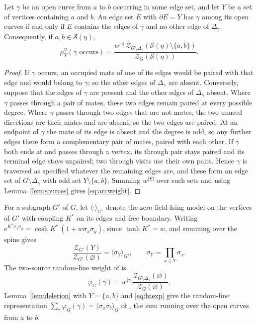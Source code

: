 \begin{lemma}\label{lem:deletion}
Let $\gamma$ be an open curve from $a$ to $b$ occurring in some edge set, and let $Y$ be a set of vertices containing $a$ and $b$. An edge set $E$ with $\partial E=Y$ has $\gamma$ among its open curves if and only if $E$ contains the edges of $\gamma$ and no other edge of $\Delta_\gamma$. Consequently, if $a,b\in\mathcal S(\eta)$,
\begin{equation}\label{eq:arcweight}
 \mu_V^\eta(\gamma\text{ occurs})
 =\frac{w^{|\gamma|}\,\mathcal Z_{G\setminus\Delta_\gamma}(\mathcal S(\eta)\setminus\{a,b\})}{\mathcal Z_G(\mathcal S(\eta))}.
\end{equation}
\end{lemma}
\begin{proof}
If $\gamma$ occurs, an occupied mate of one of its edges would be paired with that edge and would belong to $\gamma$; so the other edges of $\Delta_\gamma$ are absent. Conversely, suppose that the edges of $\gamma$ are present and the other edges of $\Delta_\gamma$ absent. Where $\gamma$ passes through a pair of mates, these two edges remain paired at every possible degree. Where $\gamma$ passes through two edges that are not mates, the two unused directions are their mates and are absent, so the two edges are paired. At an endpoint of $\gamma$ the mate of its edge is absent and the degree is odd, so any further edges there form a complementary pair of mates, paired with each other. If $\gamma$ both ends at and passes through a vertex, its through pair stays paired and its terminal edge stays unpaired; two through visits use their own pairs. Hence $\gamma$ is traversed as specified whatever the remaining edges are, and these form an edge set of $G\setminus\Delta_\gamma$ with odd set $Y\setminus\{a,b\}$. Summing $w^{|E|}$ over such sets and using Lemma~\ref{lem:sources} gives \eqref{eq:arcweight}.
\end{proof}

For a subgraph $G'$ of $G$, let $\langle\cdot\rangle_{G'}$ denote the zero-field Ising model on the vertices of $G'$ with coupling $K^*$ on its edges and free boundary. Writing $e^{K^*\sigma_x\sigma_y}=\cosh K^*\,(1+w\sigma_x\sigma_y)$, since $\tanh K^*=w$, and summing over the spins gives
\begin{equation}\label{eq:htexp}
 \frac{\mathcal Z_{G'}(Y)}{\mathcal Z_{G'}(\varnothing)}=\langle\sigma_Y\rangle_{G'},\qquad
 \sigma_Y=\prod_{x\in Y}\sigma_x.
\end{equation}
The two-source random-line weight of \cite[(6.8)]{PV99} is
\begin{equation}\label{eq:lineweight}
 \varphi_G(\gamma)=w^{|\gamma|}\frac{\mathcal Z_{G\setminus\Delta_\gamma}(\varnothing)}{\mathcal Z_G(\varnothing)}.
\end{equation}
Lemma~\ref{lem:deletion} with $Y=\{a,b\}$ and \eqref{eq:htexp} give the random-line representation $\sum_{\gamma}\varphi_G(\gamma)=\langle\sigma_a\sigma_b\rangle_G$ of \cite[(6.9)]{PV99}, the sum running over the open curves from $a$ to $b$.

